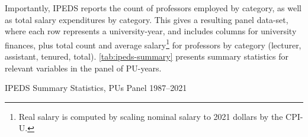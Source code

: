 \documentclass[notitlepage,12pt]{article}
\begin{document}
Importantly, IPEDS reports the count of professors employed by category, as well as total salary expenditures by category.
This gives a resulting panel data-set, where each row represents a university-year, and includes columns for university finances, plus total count and average salary\footnote{
    Real salary is computed by scaling nominal salary to 2021 dollars by the CPI-U.
} for professors by category (lecturer, assistant, tenured, total).
\autoref{tab:ipeds-summary} presents summary statistics for relevant variables in the panel of PU-years.

\begin{table}[h!]
    \onehalfspacing
    \centering
    \caption{IPEDS Summary Statistics, PUs Panel 1987--2021}
    \makebox[\textwidth][c]{}
    \label{tab:ipeds-summary}
\end{table}
\end{document}
